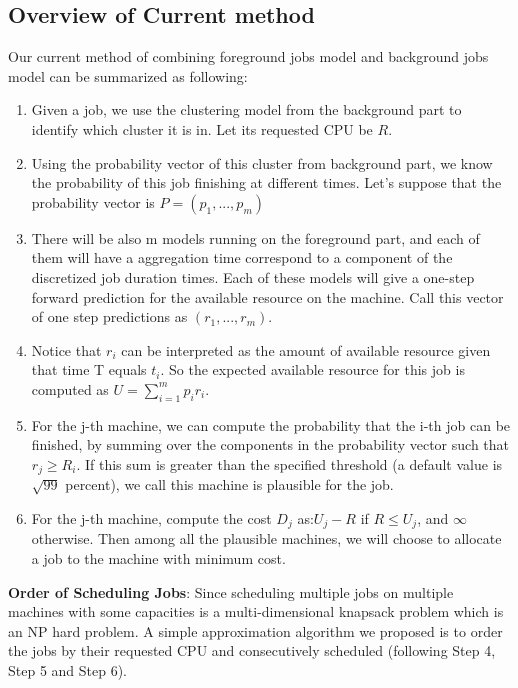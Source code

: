 \documentclass{article}
\begin{document}
\subsection{Overview of Current method}
\begin{flushleft}
Our current method of combining foreground jobs model and background jobs model can be summarized as following:

\begin{enumerate}[Step 1:]
    \item Given a job, we use the clustering model from the background part to identify which cluster it is in. Let its requested CPU be $R$.
    \item Using the probability vector of this cluster from background part, we know the probability of this job finishing at different times. Let's suppose that the probability vector is $P = (p_{1}, ..., p_{m})$
    \item There will be also m models running on the foreground part, and each of them will have a aggregation time correspond to a component of the discretized job duration times. Each of these models will give a one-step forward prediction for the available resource on the machine. Call this vector of one step predictions as $(r_1, ... , r_m)$.
    \item Notice that $r_i$ can be interpreted as the amount of available resource given that time T equals $t_i$. So the expected available resource for this job is computed as $U = \sum_{i=1}^{m} p_i r_i$.
    \item For the j-th machine, we can compute the probability that the i-th job can be finished, by summing over the components in the probability vector such that $r_j \geq R_i$. If this sum is greater than the specified threshold (a default value is $\sqrt{99}$ percent), we call this machine is plausible for the job. 
    \item For the j-th machine, compute the cost $D_j$ as:$U_j - R$ if $R \leq U_j$, and $\infty$ otherwise. Then among all the plausible machines, we will choose to allocate a job to the machine with minimum cost.
\end{enumerate}

\textbf{Order of Scheduling Jobs}: Since scheduling multiple jobs on multiple machines with some capacities is a multi-dimensional knapsack problem which is an NP hard problem. A simple approximation algorithm we proposed is to order the jobs by their requested CPU and consecutively scheduled (following Step 4, Step 5 and Step 6).


\end{flushleft}
\end{document}
